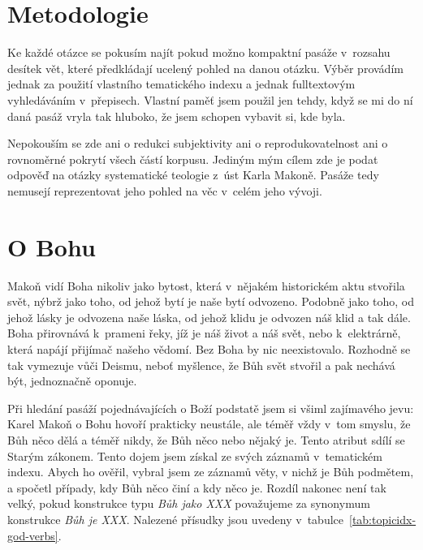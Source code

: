 \section{Metodologie}

Ke každé otázce se pokusím najít pokud možno kompaktní pasáže v~rozsahu desítek
vět, které předkládají ucelený pohled na danou otázku. Výběr provádím jednak za
použití vlastního tematického indexu a jednak fulltextovým vyhledáváním
v~přepisech. Vlastní paměť jsem použil jen tehdy, když se mi do ní daná pasáž
vryla tak hluboko, že jsem schopen vybavit si, kde byla.

Nepokouším se zde ani o redukci subjektivity ani o reprodukovatelnost ani o
rovnoměrné pokrytí všech částí korpusu. Jediným mým cílem zde je podat odpověď
na otázky systematické teologie z~úst Karla Makoně. Pasáže tedy nemusejí
reprezentovat jeho pohled na věc v~celém jeho vývoji.

\section{O Bohu}

Makoň vidí Boha nikoliv jako bytost, která v~nějakém historickém aktu stvořila
svět, nýbrž jako toho, od jehož bytí je naše bytí odvozeno. Podobně jako toho,
od jehož lásky je odvozena naše láska, od jehož klidu je odvozen náš klid a tak
dále. Boha přirovnává k~prameni řeky, jíž je náš život a náš svět, nebo
k~elektrárně, která napájí přijímač našeho vědomí. Bez Boha by nic neexistovalo.
Rozhodně se tak vymezuje vůči Deismu, neboť myšlence, že Bůh svět stvořil a pak
nechává být, jednoznačně oponuje.

Při hledání pasáží pojednávajících o Boží podstatě jsem si všiml zajímavého
jevu: Karel Makoň o Bohu hovoří prakticky neustále, ale téměř vždy v~tom smyslu,
že Bůh něco dělá a téměř nikdy, že Bůh něco nebo nějaký je. Tento atribut sdílí
se Starým zákonem\cite{brueggemann2010old}. Tento dojem jsem získal ze svých
záznamů v~tematickém indexu. Abych ho ověřil, vybral jsem ze záznamů věty, v nichž je
Bůh podmětem, a spočetl případy, kdy Bůh něco činí a kdy něco je. Rozdíl nakonec
není tak velký, pokud konstrukce typu \textit{Bůh jako XXX} považujeme za
synonymum konstrukce \textit{Bůh je XXX}. Nalezené přísudky jsou uvedeny
v~tabulce~\ref{tab:topicidx-god-verbs}.

